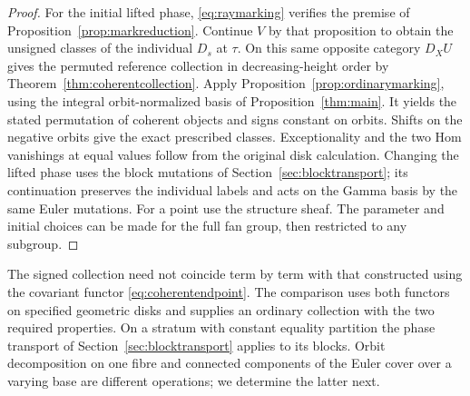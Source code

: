\begin{proof}
For the initial lifted phase, \eqref{eq:raymarking} verifies the premise of Proposition~\ref{prop:markreduction}. Continue $V$ by that proposition to obtain the unsigned classes of the individual $D_s$ at $\tau$. On this same opposite category $D_X U$ gives the permuted reference collection in decreasing-height order by Theorem~\ref{thm:coherentcollection}. Apply Proposition~\ref{prop:ordinarymarking}, using the integral orbit-normalized basis of Proposition~\ref{thm:main}. It yields the stated permutation of coherent objects and signs constant on orbits. Shifts on the negative orbits give the exact prescribed classes. Exceptionality and the two Hom vanishings at equal values follow from the original disk calculation. Changing the lifted phase uses the block mutations of Section~\ref{sec:blocktransport}; its continuation preserves the individual labels and acts on the Gamma basis by the same Euler mutations. For a point use the structure sheaf. The parameter and initial choices can be made for the full fan group, then restricted to any subgroup.
\end{proof}

The signed collection need not coincide term by term with that constructed using the covariant functor \eqref{eq:coherentendpoint}. The comparison uses both functors on specified geometric disks and supplies an ordinary collection with the two required properties. On a stratum with constant equality partition the phase transport of Section~\ref{sec:blocktransport} applies to its blocks. Orbit decomposition on one fibre and connected components of the Euler cover over a varying base are different operations; we determine the latter next.
